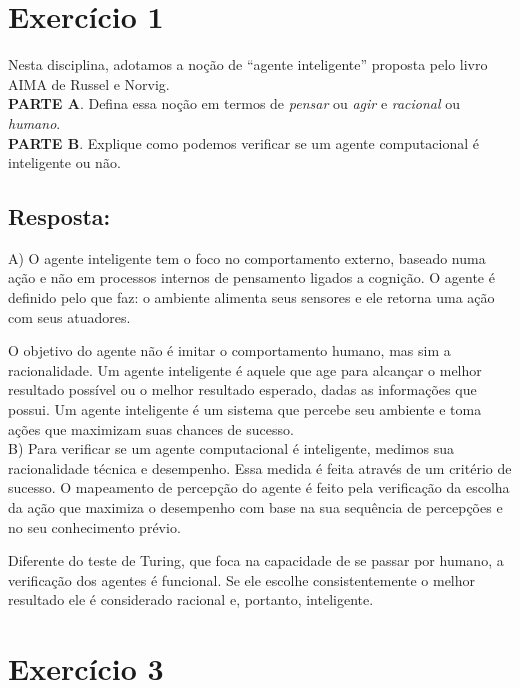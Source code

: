 \documentclass[a4paper,12pt]{article}
\begin{document}
\section*{Exercício 1}

Nesta disciplina, adotamos a noção de “agente inteligente” proposta
pelo livro AIMA de Russel e Norvig.\\

\textbf{PARTE A}. Defina essa noção em termos de \textit{pensar} ou \textit{agir} e \textit{racional} ou \textit{humano}.\\

\textbf{PARTE B}. Explique como podemos verificar se um agente computacional é inteligente
ou não.\\

\subsection*{Resposta:}

\bigskip

A) O agente inteligente tem o foco no comportamento externo, baseado numa ação e não em processos internos de pensamento ligados a cognição. O agente é definido pelo que faz: o ambiente alimenta seus sensores e ele retorna uma ação com seus atuadores.

O objetivo do agente não é imitar o comportamento humano, mas sim a racionalidade. Um agente inteligente é aquele que age para alcançar o melhor resultado possível ou o melhor resultado esperado, dadas as informações que possui.
Um agente inteligente é um sistema que percebe seu ambiente e toma ações que maximizam suas chances de sucesso.\\

B) Para verificar se um agente computacional é inteligente, medimos sua racionalidade técnica e desempenho.
Essa medida é feita através de um critério de sucesso. O mapeamento de percepção do agente é feito pela verificação da  escolha da ação que maximiza o desempenho com base na sua sequência de percepções e no seu conhecimento prévio.

Diferente do teste de Turing, que foca na capacidade de se passar por humano, a verificação dos agentes é funcional. Se ele escolhe consistentemente o melhor resultado ele é considerado racional e, portanto, inteligente.


\newpage
\section*{Exercício 3}
\end{document}
